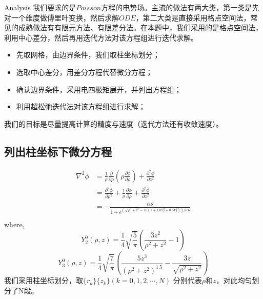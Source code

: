 \documentclass[letterpaper,12pt]{article}
\begin{document}
\begin{section}{Analysis}
    我们要求的是$Poisson$方程的电势场。主流的做法有两大类，第一类是先对一个维度做傅里叶变换，然后求解$ODE$，第二大类是直接采用格点空间法，常见的成熟做法有有限元方法、有限差分法。在本题中，我们采用的是格点空间法，利用中心差分，然后再用迭代方法对该方程组进行迭代求解。
	\begin{itemize}
		\item 先取网格，由边界条件，我们取柱坐标划分；
        \item 选取中心差分，用差分方程代替微分方程；
        \item 确认边界条件，采用电四极矩展开，并列出方程组；
		\item 利用超松弛迭代法对该方程组进行求解；
	\end{itemize}\par
	我们的目标是尽量提高计算的精度与速度（迭代方法还有收敛速度）。\par

    \subsection{列出柱坐标下微分方程}
    \begin{align*}
        \nabla^2\phi &= \frac{1}{\rho}\frac{\partial}{\partial{\rho}}(\rho\frac{\partial \phi}{\partial \rho})+\frac{\partial^2\phi}{\partial z^2}\\
        &= \frac{\partial^2 \phi}{\partial \rho^2} + \frac{1}{\rho}\frac{\partial \phi}{\partial \rho} + \frac{\partial^2\phi}{\partial z^2}\\
        &=  - \frac{0.8}{1+e^{(\sqrt{\rho^2+z^2}-10(1+1.0Y_2^0+0.5Y_3^0))/0.6}}\\
    \end{align*}
    where, $$Y_2^0(\rho,z)=\frac{1}{4}\sqrt{\frac{5}{\pi}}(\frac{3z^2}{\rho^2+z^2}-1)$$
    $$Y_3^0(\rho,z)=\frac{1}{4}\sqrt{\frac{7}{\pi}}(\frac{5z^3}{(\rho^2+z^2)^{1.5}}-\frac{3z}{\sqrt{\rho^2+z^2}})$$
        \indent 我们采用柱坐标划分，取$\{r_k\}\{z_k\}(k=0,1,2,\cdots,N)$ 分别代表$\rho$和$z$，对此均匀划分了N段。


\end{section}
\end{document}
